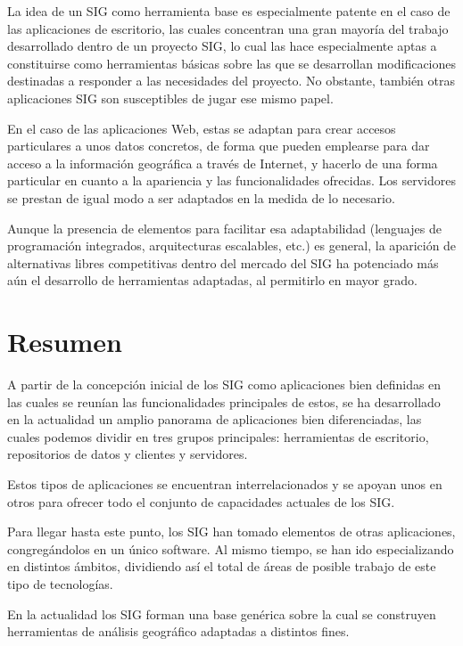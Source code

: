 La idea de un SIG como herramienta base es especialmente patente en el caso de las aplicaciones de escritorio, las cuales concentran una gran mayoría del trabajo desarrollado dentro de un proyecto SIG, lo cual las hace especialmente aptas a constituirse como herramientas básicas sobre las que se desarrollan modificaciones destinadas a responder a las necesidades del proyecto. No obstante, también otras aplicaciones SIG son susceptibles de jugar ese mismo papel.

En el caso de las aplicaciones Web, estas se adaptan para crear accesos particulares a unos datos concretos, de forma que pueden emplearse para dar acceso a la información geográfica a través de Internet, y hacerlo de una forma particular en cuanto a la apariencia y las funcionalidades ofrecidas. Los servidores se prestan de igual modo a ser adaptados en la medida de lo necesario.

Aunque la presencia de elementos para facilitar esa adaptabilidad (lenguajes de programación integrados, arquitecturas escalables, etc.) es general, la aparición de alternativas libres competitivas dentro del mercado del SIG ha potenciado más aún el desarrollo de herramientas adaptadas, al permitirlo en mayor grado.


\section{Resumen}

A partir de la concepción inicial de los SIG como aplicaciones bien definidas en las cuales se reunían las funcionalidades principales de estos, se ha desarrollado en la actualidad un amplio panorama de aplicaciones bien diferenciadas, las cuales podemos dividir en tres grupos principales: herramientas de escritorio, repositorios de datos y clientes y servidores. 

Estos tipos de aplicaciones se encuentran interrelacionados y se apoyan unos en otros para ofrecer todo el conjunto de capacidades actuales de los SIG.

Para llegar hasta este punto, los SIG han tomado elementos de otras aplicaciones, congregándolos en un único software. Al mismo tiempo, se han ido especializando en distintos ámbitos, dividiendo así el total de áreas de posible trabajo de este tipo de tecnologías.

En la actualidad los SIG forman una base genérica sobre la cual se construyen herramientas de análisis geográfico adaptadas a distintos fines.

\pagestyle{empty}
